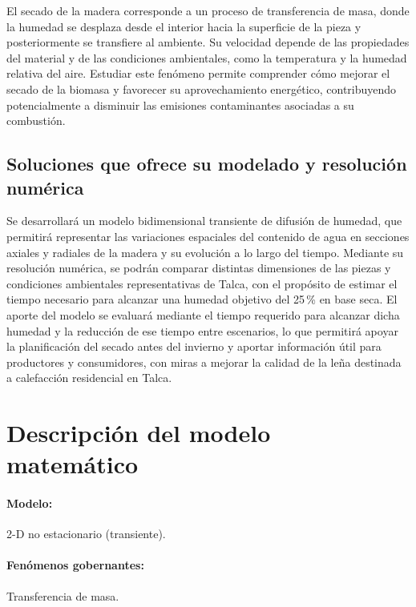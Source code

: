 \documentclass[11pt,a4paper]{article}
\begin{document}
El secado de la madera corresponde a un proceso de transferencia de masa, donde la humedad se desplaza desde el interior hacia la superficie de la pieza y posteriormente se transfiere al ambiente. Su velocidad depende de las propiedades del material y de las condiciones ambientales, como la temperatura y la humedad relativa del aire. Estudiar este fenómeno permite comprender cómo mejorar el secado de la biomasa y favorecer su aprovechamiento energético, contribuyendo potencialmente a disminuir las emisiones contaminantes asociadas a su combustión.

\subsection{Soluciones que ofrece su modelado y resolución numérica}

Se desarrollará un modelo bidimensional transiente de difusión de humedad, que permitirá representar las variaciones espaciales del contenido de agua en secciones axiales y radiales de la madera y su evolución a lo largo del tiempo. Mediante su resolución numérica, se podrán comparar distintas dimensiones de las piezas y condiciones ambientales representativas de Talca, con el propósito de estimar el tiempo necesario para alcanzar una humedad objetivo del 25\,\% en base seca. El aporte del modelo se evaluará mediante el tiempo requerido para alcanzar dicha humedad y la reducción de ese tiempo entre escenarios, lo que permitirá apoyar la planificación del secado antes del invierno y aportar información útil para productores y consumidores, con miras a mejorar la calidad de la leña destinada a calefacción residencial en Talca.

\section{Descripción del modelo matemático}

\paragraph{Modelo:} 2-D no estacionario (transiente).

\paragraph{Fenómenos gobernantes:} Transferencia de masa.
\end{document}

